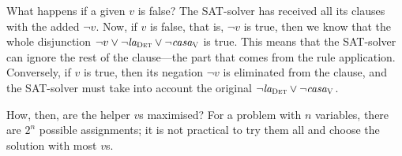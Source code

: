 What happens if a given $v$ is false? The SAT-solver has received all its clauses 
with the added $\neg{}v$. 
Now, if $v$ is false, that is, $\neg{}v$ is true, then we know that 
the whole disjunction $\neg{}v \vee \neg\text{\em la}_{\text{\sc Det}} \vee \neg\text{\em casa}_{\text{\sc V}}$ is true.
This means that the SAT-solver can ignore the rest of the clause---the part that comes from the rule application.
Conversely, if $v$ is true, then its negation $\neg{}v$ is eliminated from the clause, 
and the SAT-solver must take into account the original $\neg\text{\em la}_{\text{\sc Det}} \vee \neg\text{\em casa}_{\text{\sc V}}$.


How, then, are the helper $v$s maximised? 
For a problem with $n$ variables, there are $2^n$ possible assignments; 
it is not practical to try them all and choose the solution with most $v$s.










